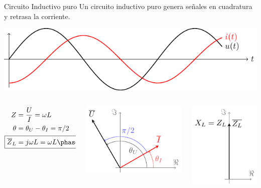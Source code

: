 \documentclass[aspectratio=169, usenames,svgnames,dvipsnames]{beamer}
\begin{document}
\begin{frame}[label={sec:org1699bc9}]{Circuito Inductivo puro}
Un circuito inductivo puro genera \alert{señales en cuadratura} y \alert{retrasa la corriente}.

\begin{center}
\includegraphics[height=0.3\textheight]{../figs/inductivoPuro.pdf}
\end{center}

\begin{columns}
\begin{column}{0.3\columnwidth}
\begin{align*}
  Z &= \frac{U}{I} = \omega L\\
  \theta &= \theta_U - \theta_I = \pi/2\\
  \Aboxed{\overline{Z}_L &= j\omega L = \omega L \phase{\ang{90}}}
\end{align*}
\end{column}


\begin{column}{0.4\columnwidth}
\begin{center}
\includegraphics[height=0.4\textheight]{../figs/fasorInductancia_VI.pdf}
\end{center}
\end{column}


\begin{column}{0.3\columnwidth}
\begin{center}
\includegraphics[height=0.4\textheight]{../figs/fasorInductancia.pdf}
\end{center}
\end{column}
\end{columns}
\end{frame}
\end{document}
